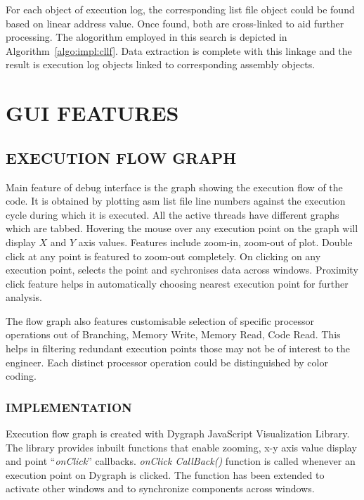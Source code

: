 
For each object of execution log, the corresponding list file object could be found based on linear address value. Once found, both are cross-linked to aid further processing. The alogorithm employed in this search is depicted in Algorithm~\ref{algo:impl:cllf}. Data extraction is complete with this linkage and the result is execution log objects linked to corresponding assembly objects.

\section {GUI FEATURES}

\subsection {EXECUTION FLOW GRAPH}
Main feature of debug interface is the graph showing the execution flow of the code. It is obtained by plotting asm list file line numbers against the execution cycle during which it is executed. All the active threads have different graphs which are tabbed. Hovering the mouse over any execution point on the graph will display $X$ and $Y$ axis values. Features include zoom-in, zoom-out of plot. Double click at any point is featured to zoom-out completely. On clicking on any execution point, selects the point and sychronises data across windows. Proximity click feature helps in automatically choosing nearest execution point for further analysis.
 
The flow graph also features customisable selection of specific processor operations out of Branching, Memory Write, Memory Read, Code Read. This helps in filtering redundant execution points those may not be of interest to the engineer. Each distinct processor operation could be distinguished by color coding.   

\subsubsection {IMPLEMENTATION}

Execution flow graph is created with Dygraph JavaScript Visualization Library\cite{http:dygraphs}. The library provides inbuilt functions that enable zooming, x-y axis value display and point ``{\it onClick}'' callbacks. {\it onClick CallBack()} function is called whenever an execution point on Dygraph is clicked. The function has been extended to activate other windows and to synchronize components across windows.

